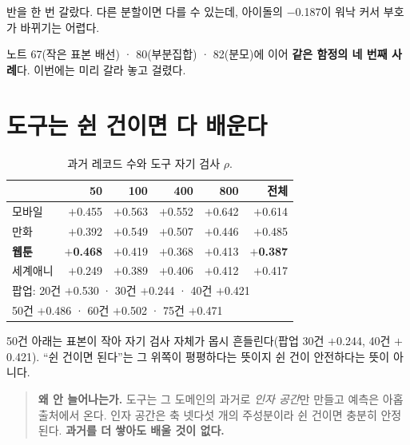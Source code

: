 \documentclass[10pt]{article}
\begin{document}
{반을 한 번 갈랐다. 다른 분할이면 다를 수 있는데, 아이돌의 $-$0.187이 워낙
커서 부호가 바뀌기는 어렵다.}

노트 67(작은 표본 배선) · 80(부분집합) · 82(분모)에 이어 \textbf{같은 함정의
네 번째 사례}다. 이번에는 미리 갈라 놓고 걸렸다.

\section{도구는 쉰 건이면 다 배운다}

\begin{table}[t]
\centering\tsize
\caption{과거 레코드 수와 도구 자기 검사 $\rho$.}
\begin{tabular}{lrrrrr}
\toprule
& 50 & 100 & 400 & 800 & 전체 \\
\midrule
모바일 & $+$0.455 & $+$0.563 & $+$0.552 & $+$0.642 & $+$0.614 \\
만화 & $+$0.392 & $+$0.549 & $+$0.507 & $+$0.446 & $+$0.485 \\
\textbf{웹툰} & \textbf{$+$0.468} & $+$0.419 & $+$0.368 & $+$0.413 &
\textbf{$+$0.387} \\
세계애니 & $+$0.249 & $+$0.389 & $+$0.406 & $+$0.412 & $+$0.417 \\
\midrule
\multicolumn{6}{l}{팝업: 20건 $+$0.530 · 30건 $+$0.244 · 40건 $+$0.421} \\
\multicolumn{6}{l}{\hspace{2.4em}50건 $+$0.486 · 60건 $+$0.502 · 75건 $+$0.471} \\
\bottomrule
\end{tabular}
\end{table}

{50건 아래는 표본이 작아 자기 검사 자체가 몹시 흔들린다(팝업 30건 $+$0.244,
40건 $+$0.421). ``쉰 건이면 된다''는 그 위쪽이 평평하다는 뜻이지 쉰 건이
안전하다는 뜻이 아니다.}

\begin{quote}\fontsize{9.5}{11.5}\selectfont
\textbf{왜 안 늘어나는가.} 도구는 그 도메인의 과거로 \emph{인자 공간}만 만들고
예측은 아홉 출처에서 온다. 인자 공간은 축 넷다섯 개의 주성분이라 쉰 건이면
충분히 안정된다. \textbf{과거를 더 쌓아도 배울 것이 없다.}
\end{quote}
\end{document}
